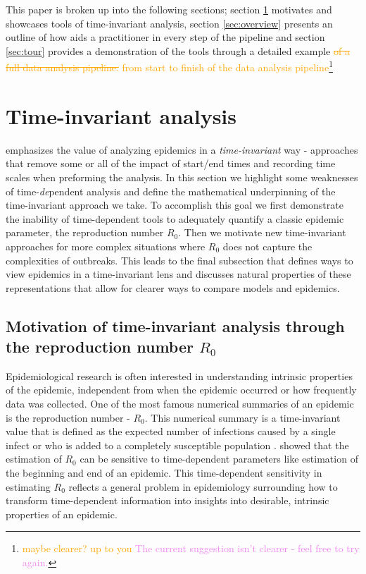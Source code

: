 \documentclass[
  shortnames]{jss}
\begin{document}
This paper is broken up into the following sections; section
\ref{sec:time-invariant} motivates and showcases tools of time-invariant
analysis, section \ref{sec:overview} presents an outline of how
 aids a practitioner in every step of the pipeline and
section \ref{sec:tour} provides a demonstration of the tools through a
detailed
example\textcolor{orange}{\sout{ of a full data analysis pipeline.}}
\textcolor{orange}{from start to finish of the data analysis pipeline}\footnote{\textcolor{orange}{maybe clearer? up to you} \textcolor{violet}{The current suggestion isn't clearer - feel free to try again.}}

\hypertarget{sec:time-invariant}{%
\section{Time-invariant analysis}\label{sec:time-invariant}}

 emphasizes the value of analyzing epidemics in a
\textit{time-invariant} way - approaches that remove some or all of the
impact of start/end times and recording time scales when preforming the
analysis. In this section we highlight some weaknesses of
time-\textit{de}pendent analysis and define the mathematical
underpinning of the time-invariant approach we take. To accomplish this
goal we first demonstrate the inability of time-dependent tools to
adequately quantify a classic epidemic parameter, the reproduction
number \(R_0\). Then we motivate new time-invariant approaches for more
complex situations where \(R_0\) does not capture the complexities of
outbreaks. This leads to the final subsection that defines ways to view
epidemics in a time-invariant lens and discusses natural properties of
these representations that allow for clearer ways to compare models and
epidemics.

\subsection[Motivation through the reproduction number $R_0$]{Motivation
of time-invariant analysis through the reproduction number
\(R_0\)}\label{sec:r0_subsection}

Epidemiological research is often interested in understanding intrinsic
properties of the epidemic, independent from when the epidemic occurred
or how frequently data was collected. One of the most famous numerical
summaries of an epidemic is the reproduction number - \(R_0\). This
numerical summary is a time-invariant value that is defined as the
expected number of infections caused by a single infect or who is added
to a completely susceptible population \citep{anderson1992}.
\citet{Gallagher2020} showed that the estimation of \(R_0\) can be
sensitive to time-dependent parameters like estimation of the beginning
and end of an epidemic. This time-dependent sensitivity in estimating
\(R_0\) reflects a general problem in epidemiology surrounding how to
transform time-dependent information into insights into desirable,
intrinsic properties of an epidemic.
\end{document}
